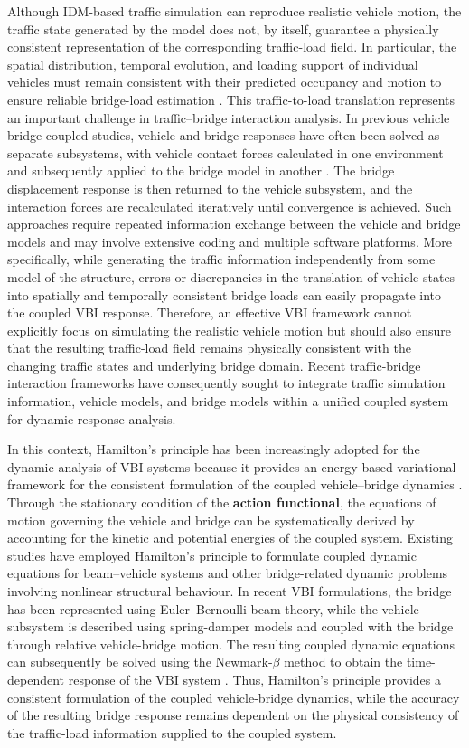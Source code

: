 \documentclass[journal]{IEEEtran}
\begin{document}
Although IDM-based traffic simulation can reproduce realistic vehicle motion, the traffic state generated by the model does not, by itself, guarantee a physically consistent representation of the corresponding traffic-load field. In particular, the spatial distribution, temporal evolution, and loading support of individual vehicles must remain consistent with their predicted occupancy and motion to ensure reliable bridge-load estimation \cite{wangxu2019}. This traffic-to-load translation represents an important challenge in traffic--bridge interaction analysis. In previous vehicle bridge coupled studies, vehicle and bridge responses have often been solved as separate subsystems, with vehicle contact forces calculated in one environment and subsequently applied to the bridge model in another \cite{yangfonder1996,green1994,pan2002}. The bridge displacement response is then returned to the vehicle subsystem, and the interaction forces are recalculated iteratively until convergence is achieved. Such approaches require repeated information exchange between the vehicle and bridge models and may involve extensive coding and multiple software platforms. More specifically, while generating the traffic information independently from some model of the structure, errors or discrepancies in the translation of vehicle states into spatially and temporally consistent bridge loads can easily propagate into the coupled VBI response. Therefore, an effective VBI framework cannot explicitly focus on simulating the realistic vehicle motion but should also ensure that the resulting traffic-load field remains physically consistent with the changing traffic states and underlying bridge domain. Recent traffic-bridge interaction frameworks have consequently sought to integrate traffic simulation information, vehicle models, and bridge models within a unified coupled system for dynamic response analysis.

In this context, Hamilton's principle has been increasingly adopted for the dynamic analysis of VBI systems because it provides an energy-based variational framework for the consistent formulation of the coupled vehicle--bridge dynamics \cite{mo2024}. Through the stationary condition of the \textbf{action functional}, the equations of motion governing the vehicle and bridge can be systematically derived by accounting for the kinetic and potential energies of the coupled system. Existing studies have employed Hamilton's principle to formulate coupled dynamic equations for beam--vehicle systems and other bridge-related dynamic problems involving nonlinear structural behaviour. In recent VBI formulations, the bridge has been represented using Euler--Bernoulli beam theory, while the vehicle subsystem is described using spring-damper models and coupled with the bridge through relative vehicle-bridge motion. The resulting coupled dynamic equations can subsequently be solved using the Newmark-$\beta$ method to obtain the time-dependent response of the VBI system \cite{mo2024,newmark1959}. Thus, Hamilton's principle provides a consistent formulation of the coupled vehicle-bridge dynamics, while the accuracy of the resulting bridge response remains dependent on the physical consistency of the traffic-load information supplied to the coupled system.
\end{document}
